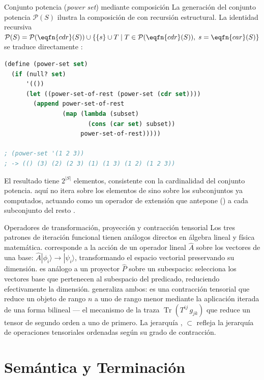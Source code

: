 \begin{ejemplo}{Conjunto potencia (\textit{power set}) mediante composición}
La generación del conjunto potencia $\mathcal{P}(S)$ ilustra la composición de  con recursión estructural. La identidad recursiva $\mathcal{P}(S) = \mathcal{P}(\eqfn{cdr}(S)) \cup \{\{s\} \cup T \mid T \in \mathcal{P}(\eqfn{cdr}(S)),\; s = \eqfn{car}(S)\}$ se traduce directamente \cite{SICP}:
\begin{lstlisting}[language=Lisp, caption={Generación del conjunto potencia}]
(define (power-set set)
  (if (null? set)
      '(())
      (let ((power-set-of-rest (power-set (cdr set))))
        (append power-set-of-rest
                (map (lambda (subset)
                       (cons (car set) subset))
                     power-set-of-rest)))))

; (power-set '(1 2 3))
; -> (() (3) (2) (2 3) (1) (1 3) (1 2) (1 2 3))
\end{lstlisting}
El resultado tiene $2^{|S|}$ elementos, consistente con la cardinalidad del conjunto potencia.  aquí no itera sobre los elementos de  sino sobre los subconjuntos ya computados, actuando como un operador de extensión que antepone () a cada subconjunto del resto \cite{SICP}.
\end{ejemplo}

\begin{fisicaconexion}{Operadores de transformación, proyección y contracción tensorial}
Los tres patrones de iteración funcional tienen análogos directos en álgebra lineal y física matemática.  corresponde a la acción de un operador lineal $\hat{A}$ sobre los vectores de una base: $\hat{A}|\phi_i\rangle \to |\psi_i\rangle$, transformando el espacio vectorial preservando su dimensión.  es análogo a un proyector $\hat{P}$ sobre un subespacio: selecciona los vectores base que pertenecen al subespacio del predicado, reduciendo efectivamente la dimensión.  generaliza ambos: es una contracción tensorial que reduce un objeto de rango $n$ a uno de rango menor mediante la aplicación iterada de una forma bilineal — el mecanismo de la traza $\operatorname{Tr}(T^{ij}\,g_{jk})$ que reduce un tensor de segundo orden a uno de primero. La jerarquía ,  $\subset$  refleja la jerarquía de operaciones tensoriales ordenadas según su grado de contracción.
\end{fisicaconexion}


\section{Semántica y Terminación}
\label{sec:4_5_semantica}

